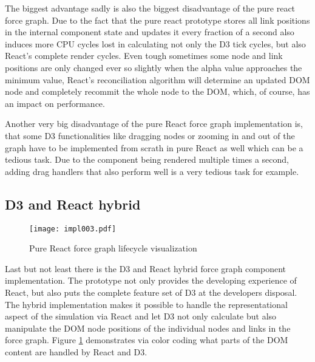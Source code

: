 The biggest advantage sadly is also the biggest disadvantage of the pure react force graph. Due to the fact that the pure react prototype stores all link positions in the internal component state and updates it every fraction of a second also induces more CPU cycles lost in calculating not only the D3 tick cycles, but also React's complete render cycles. Even tough sometimes some node and link positions are only changed ever so slightly when the alpha value approaches the minimum value, React's reconciliation algorithm will determine an updated DOM node and completely recommit the whole node to the DOM, which, of course, has an impact on performance. 

Another very big disadvantage of the pure React force graph implementation is, that some D3 functionalities like dragging nodes or zooming in and out of the graph have to be implemented from scrath in pure React as well which can be a tedious task. Due to the component being rendered multiple times a second, adding drag handlers that also perform well is a very tedious task for example. 


\subsection{D3 and React hybrid}
\label{sub:D3AndReactHybrid}

\begin{figure}
\centering
\texttt{[image: impl003.pdf]}
\caption{Pure React force graph lifecycle visualization}
\label{fig:reactD3HybridLifeCycle}
\end{figure}

Last but not least there is the D3 and React hybrid force graph component implementation. The prototype not only provides the developing experience of React, but also puts the complete feature set of D3 at the developers disposal. The hybrid implementation makes it possible to handle the representational aspect of the simulation via React and let D3 not only calculate but also manipulate the DOM node positions of the individual nodes and links in the force graph. Figure \ref{fig:reactD3HybridLifeCycle} demonstrates via color coding what parts of the DOM content are handled by React and D3. 

